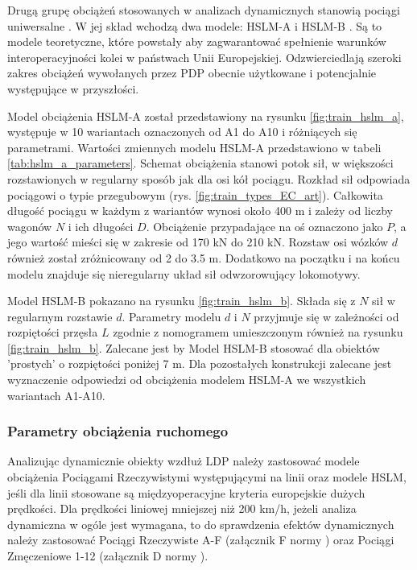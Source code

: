 Drugą grupę obciążeń stosowanych w analizach dynamicznych stanowią pociągi uniwersalne . W jej skład wchodzą dwa modele: HSLM-A i HSLM-B . Są to modele teoretyczne, które powstały aby zagwarantować spełnienie warunków interoperacyjności kolei w państwach Unii Europejskiej. Odzwierciedlają szeroki zakres obciążeń wywołanych przez PDP obecnie użytkowane i potencjalnie występujące w przyszłości. 

Model obciążenia HSLM-A został przedstawiony na rysunku \ref{fig:train_hslm_a}, występuje w 10 wariantach oznaczonych od A1 do A10 i różniących się parametrami. Wartości zmiennych modelu HSLM-A przedstawiono w tabeli \ref{tab:hslm_a_parameters}. Schemat obciążenia stanowi potok sił, w większości rozstawionych w regularny sposób jak dla osi kół pociągu. Rozkład sił odpowiada pociągowi o typie przegubowym (rys. \ref{fig:train_types_EC_art}). Całkowita długość pociągu w każdym z wariantów wynosi około 400 m i zależy od liczby wagonów $N$ i ich długości $D$. Obciążenie przypadające na oś oznaczono jako $P$, a jego wartość mieści się w zakresie od 170 kN do 210 kN. Rozstaw osi wózków $d$ również został zróżnicowany od 2 do 3.5 m. Dodatkowo na początku i na końcu modelu znajduje się nieregularny układ sił odwzorowujący lokomotywy. 

Model HSLM-B pokazano na rysunku \ref{fig:train_hslm_b}. Składa się z $N$ sił w regularnym rozstawie $d$. Parametry modelu $d$ i $N$ przyjmuje się w zależności od rozpiętości przęsła $L$ zgodnie z nomogramem umieszczonym również na rysunku \ref{fig:train_hslm_b}. Zalecane jest by Model HSLM-B stosować dla obiektów 'prostych' o rozpiętości poniżej 7 m. Dla pozostałych konstrukcji zalecane jest wyznaczenie odpowiedzi od obciążenia modelem HSLM-A we wszystkich wariantach A1-A10.

\subsubsection{Parametry obciążenia ruchomego}

Analizując dynamicznie obiekty wzdłuż LDP należy zastosować modele obciążenia Pociągami Rzeczywistymi występującymi na linii oraz modele HSLM, jeśli dla linii stosowane są międzyoperacyjne kryteria europejskie dużych prędkości. Dla prędkości liniowej mniejszej niż 200 km/h, jeżeli analiza dynamiczna w ogóle jest wymagana, to do sprawdzenia efektów dynamicznych należy zastosować Pociągi Rzeczywiste A-F (załącznik F normy \cite{PKNj}) oraz Pociągi Zmęczeniowe 1-12 (załącznik D normy \cite{PKNj}).

